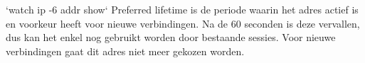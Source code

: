 `watch ip -6 addr show`
Preferred lifetime is de periode waarin het adres actief is en voorkeur heeft voor nieuwe verbindingen. Na de 60 seconden is deze vervallen, dus kan het enkel nog gebruikt worden door bestaande sessies. Voor nieuwe verbindingen gaat dit adres niet meer gekozen worden. 